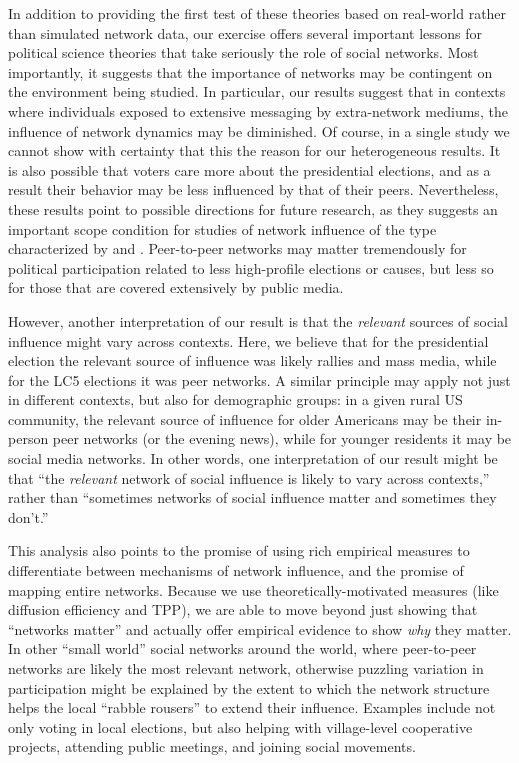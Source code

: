 \documentclass[12pt]{article}
\begin{document}
In addition to providing the first test of these theories based on real-world rather than simulated network data, our exercise offers several important lessons for political science theories that take seriously the role of social networks. Most importantly, it suggests that the importance of networks may be contingent on the environment being studied. In particular, our results suggest that in contexts where individuals exposed to extensive messaging by extra-network mediums, the influence of network dynamics may be diminished. Of course, in a single study we cannot show with certainty that this the reason for our heterogeneous results.  It is also possible that voters care more about the presidential elections, and as a result their behavior may be less influenced by that of their peers. Nevertheless, these results point to possible directions for future research, as they suggests an important scope condition for studies of network influence of the type characterized by \cite{Rolfe:2012ka} and \cite{Siegel:2009vi}. Peer-to-peer networks may matter tremendously for political participation related to less high-profile elections or causes, but less so for those that are covered extensively by public media.

However, another interpretation of our result is that the \emph{relevant} sources of social influence might vary across contexts. Here, we believe that for the presidential election the relevant source of influence was likely rallies and mass media, while for the LC5 elections it was peer networks. A similar principle may apply not just in different contexts, but also for demographic groups:  in a given rural US community, the relevant source of influence for older Americans may be their in-person peer networks (or the evening news), while for younger residents it may be social media networks. In other words, one interpretation of our result might be that ``the \emph{relevant} network of social influence is likely to vary across contexts,'' rather than ``sometimes networks of social influence matter and sometimes they don't.''

This analysis also points to the promise of using rich empirical measures to differentiate between mechanisms of network influence, and the promise of mapping entire networks. Because we use theoretically-motivated measures (like diffusion efficiency and TPP), we are able to move beyond just showing that ``networks matter'' and actually offer empirical evidence to show \emph{why} they matter.  In other ``small world'' social networks around the world, where peer-to-peer networks are likely the most relevant network, otherwise puzzling variation in participation might be explained by the extent to which the network structure helps the local ``rabble rousers'' to extend their influence.  Examples include not only voting in local elections, but also helping with village-level cooperative projects, attending public meetings, and joining social movements.
\end{document}

